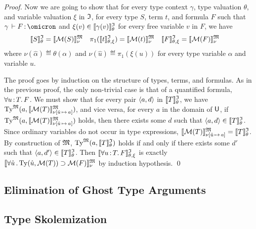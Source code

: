 \begin{proof}
Now we are going to show that for every type context $\gamma$,
type valuation $\theta$, and variable valuation $\xi$ in $\mathfrak{I}$,
for every type $S$, term $t$, and formula $F$ such that
$\gamma\,\vdash F \ty \omicron$ and
$\xi(v) \in \llbracket\gamma(v)\rrbracket^{\mathfrak{I}}_{\theta}$ for every free variable $v$ in $F$,
we have
\begin{align*}
\llbracket S \rrbracket^{\mathfrak{I}}_{\theta} &= \llbracket \mathcal{M}(S) \rrbracket^{\mathfrak{M}}_{\nu} &
\pi_1(\llbracket t \rrbracket^{\mathfrak{I}}_{\theta,\xi}) &= \llbracket \mathcal{M}(t) \rrbracket^{\mathfrak{M}}_{\nu} &
\llbracket F \rrbracket^{\mathfrak{I}}_{\theta,\xi} &= \llbracket \mathcal{M}(F) \rrbracket^{\mathfrak{M}}_{\nu}
\end{align*}
where $\nu(\hat{\alpha}) \eqdef \theta(\alpha)$ and
$\nu(\hat{u}) \eqdef \pi_1(\xi(u))$
for every type variable $\alpha$ and variable $u$.

The proof goes by induction on the structure
of types, terms, and formulas. As in the previous proof,
the only non-trivial case is
that of a quantified formula, $\forall u \operatorname{:} T .\, F$.
We must show that for every pair $\langle a,d \rangle$
in $\llbracket T \rrbracket^{\mathfrak{I}}_\theta$, we have
$\mathrm{Ty}^{\mathfrak{M}}(a, \llbracket \mathcal{M}(T) \rrbracket^{\mathfrak{M}}_{\nu[\hat{u}\,\mapsto\,a]})$,
and vice versa, for every $a$ in the domain of $\mathsf{U}$, if
$\mathrm{Ty}^{\mathfrak{M}}(a, \llbracket \mathcal{M}(T) \rrbracket^{\mathfrak{M}}_{\nu[\hat{u}\,\mapsto\,a]})$
holds, then there exists some $d$ such that $\langle a,d \rangle \in
\llbracket T \rrbracket^{\mathfrak{I}}_\theta$.
%
Since ordinary variables do not occur in type expressions,
$\llbracket \mathcal{M}(T) \rrbracket^{\mathfrak{M}}_{\nu[\hat{u}\,\mapsto\,a]} =
\llbracket T \rrbracket^{\mathfrak{I}}_\theta$.
By construction of $\mathfrak{M}$,
$\mathrm{Ty}^{\mathfrak{M}}(a, \llbracket T \rrbracket^{\mathfrak{I}}_\theta)$
holds if and only if there exists some $d'$ such that
$\langle a,d' \rangle \in \llbracket T \rrbracket^{\mathfrak{I}}_\theta$.
%
Then
$\llbracket \forall u \operatorname{:} T .\, F \rrbracket^{\mathfrak{I}}_{\theta,\xi}$
is exactly
$\llbracket \forall \hat{u} \,.\, \mathrm{Ty}(\hat{u},\mathcal{M}(T))
\supset \mathcal{M}(F) \rrbracket^{\mathfrak{M}}_{\nu}$ by induction hypothesis.
\qed
\end{proof}

\subsection{Elimination of Ghost Type Arguments} \label{ssec:ghost}
\subsection{Type Skolemization} \label{ssec:skol}


